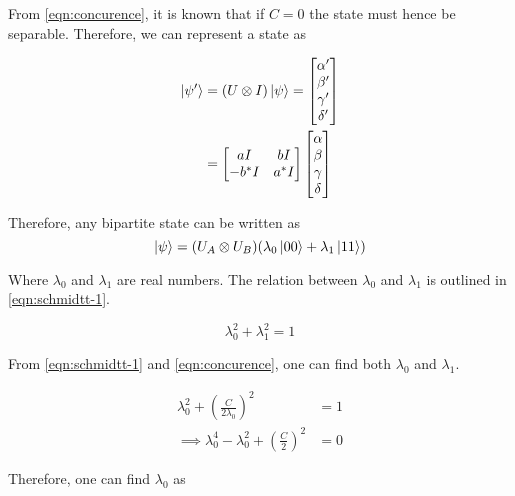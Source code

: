 \documentclass[reprint, amsmath,amssymb, aps]{revtex4-2}
\begin{document}
                From \eqref{eqn:concurence}, it is known that if $C=0$ the state must hence be separable. Therefore, we can represent a state as
                
                \begin{align*}
                    \ket{\psi'} &= (U\otimes I)\ket{\psi} = \begin{bmatrix}\alpha' \\ \beta' \\ \gamma' \\\delta' \end{bmatrix} \\
                    &= \begin{bmatrix}a I & b I \\ -b^* I & a^* I\end{bmatrix} \begin{bmatrix} \alpha\\\beta\\\gamma\\\delta\end{bmatrix}
                \end{align*}

                Therefore, any bipartite state can be written as 
                \begin{equation} \label{eqn:bipart}
                    \ket{\psi} = (U_A\otimes U_B)(\lambda_0 \ket{00} + \lambda_1 \ket{11})
                \end{equation}

                Where $\lambda_0$ and $\lambda_1$ are real numbers. The relation between $\lambda_0$ and $\lambda_1$ is outlined in \eqref{eqn:schmidtt-1}.

                \begin{equation} \label{eqn:schmidtt-1}
                    \lambda_0^2 + \lambda_1^2 = 1
                \end{equation}

                From \eqref{eqn:schmidtt-1} and \eqref{eqn:concurence}, one can find both $\lambda_0$ and $\lambda_1$.

                \begin{align*}
                    \lambda_0^2 + \left(\frac{C}{2\lambda_0}\right)^2 &= 1 \\
                    \implies \lambda_0^4 - \lambda_0^2 + \left(\frac{C}{2}\right)^2 &= 0
                \end{align*}

                Therefore, one can find $\lambda_0$ as
\end{document}
